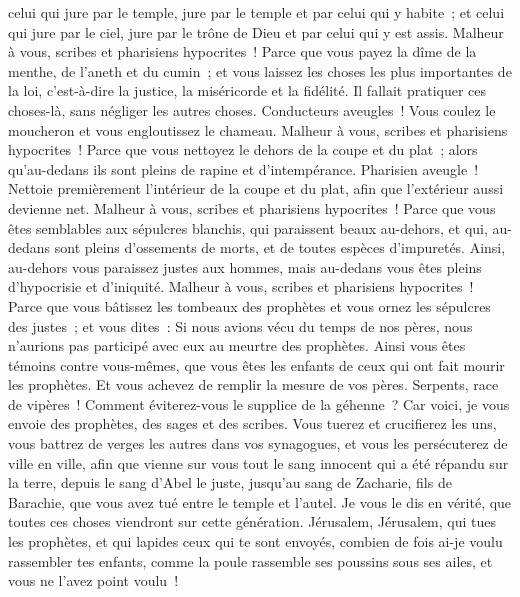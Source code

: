 \begin{multicols}{2}
celui qui jure par le temple, jure par le temple et par celui qui y habite~;
et celui qui jure par le ciel, jure par le trône de Dieu et par celui qui y est assis.
Malheur à vous, scribes et pharisiens hypocrites~! Parce que vous payez la dîme de la menthe, de l'aneth et du cumin~; et vous laissez les choses les plus importantes de la loi, c'est-à-dire la justice, la miséricorde et la fidélité. Il fallait pratiquer ces choses-là, sans négliger les autres choses.
Conducteurs aveugles~! Vous coulez le moucheron et vous engloutissez le chameau.
Malheur à vous, scribes et pharisiens hypocrites~! Parce que vous nettoyez le dehors de la coupe et du plat~; alors qu'au-dedans ils sont pleins de rapine et d'intempérance.
Pharisien aveugle~! Nettoie premièrement l'intérieur de la coupe et du plat, afin que l'extérieur aussi devienne net.
Malheur à vous, scribes et pharisiens hypocrites~! Parce que vous êtes semblables aux sépulcres blanchis, qui paraissent beaux au-dehors, et qui, au-dedans sont pleins d'ossements de morts, et de toutes espèces d'impuretés.
Ainsi, au-dehors vous paraissez justes aux hommes, mais au-dedans vous êtes pleins d'hypocrisie et d'iniquité.
Malheur à vous, scribes et pharisiens hypocrites~! Parce que vous bâtissez les tombeaux des prophètes et vous ornez les sépulcres des justes~;
et vous dites~: Si nous avions vécu du temps de nos pères, nous n'aurions pas participé avec eux au meurtre des prophètes.
Ainsi vous êtes témoins contre vous-mêmes, que vous êtes les enfants de ceux qui ont fait mourir les prophètes.
Et vous achevez de remplir la mesure de vos pères.
Serpents, race de vipères~! Comment éviterez-vous le supplice de la géhenne~?
Car voici, je vous envoie des prophètes, des sages et des scribes. Vous tuerez et crucifierez les uns, vous battrez de verges les autres dans vos synagogues, et vous les persécuterez de ville en ville,
afin que vienne sur vous tout le sang innocent qui a été répandu sur la terre, depuis le sang d'Abel le juste, jusqu'au sang de Zacharie, fils de Barachie, que vous avez tué entre le temple et l'autel.
Je vous le dis en vérité, que toutes ces choses viendront sur cette génération.
Jérusalem, Jérusalem, qui tues les prophètes, et qui lapides ceux qui te sont envoyés, combien de fois ai-je voulu rassembler tes enfants, comme la poule rassemble ses poussins sous ses ailes, et vous ne l'avez point voulu~!

\end{multicols}
